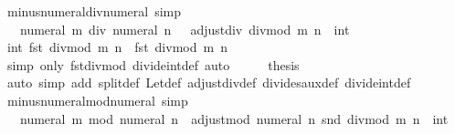 \begin{isabellebody}
\ minus{\isacharunderscore}{\kern0pt}numeral{\isacharunderscore}{\kern0pt}div{\isacharunderscore}{\kern0pt}numeral\ {\isacharbrackleft}{\kern0pt}simp{\isacharbrackright}{\kern0pt}{\isacharcolon}{\kern0pt}\isanewline
\ \ {\isachardoublequoteopen}{\isacharminus}{\kern0pt}\ numeral\ m\ div\ numeral\ n\ {\isacharequal}{\kern0pt}\ {\isacharminus}{\kern0pt}\ {\isacharparenleft}{\kern0pt}adjust{\isacharunderscore}{\kern0pt}div\ {\isacharparenleft}{\kern0pt}divmod\ m\ n{\isacharparenright}{\kern0pt}\ {\isacharcolon}{\kern0pt}{\isacharcolon}{\kern0pt}\ int{\isacharparenright}{\kern0pt}{\isachardoublequoteclose}\isanewline
%
\isadelimproof
%
\endisadelimproof
%
\isatagproof
{}\isamarkupfalse%
\ {\isacharminus}{\kern0pt}\isanewline
\ \ \isamarkupfalse%
\ {\isachardoublequoteopen}int\ {\isacharparenleft}{\kern0pt}fst\ {\isacharparenleft}{\kern0pt}divmod\ m\ n{\isacharparenright}{\kern0pt}{\isacharparenright}{\kern0pt}\ {\isacharequal}{\kern0pt}\ fst\ {\isacharparenleft}{\kern0pt}divmod\ m\ n{\isacharparenright}{\kern0pt}{\isachardoublequoteclose}\isanewline
\ \ \ \ \isamarkupfalse%
\ {\isacharparenleft}{\kern0pt}simp\ only{\isacharcolon}{\kern0pt}\ fst{\isacharunderscore}{\kern0pt}divmod\ divide{\isacharunderscore}{\kern0pt}int{\isacharunderscore}{\kern0pt}def{\isacharparenright}{\kern0pt}\ auto\isanewline
\ \ \isamarkupfalse%
\ \isamarkupfalse%
\ {\isacharquery}{\kern0pt}thesis\isanewline
\ \ \ \ \isamarkupfalse%
\ {\isacharparenleft}{\kern0pt}auto\ simp\ add{\isacharcolon}{\kern0pt}\ split{\isacharunderscore}{\kern0pt}def\ Let{\isacharunderscore}{\kern0pt}def\ adjust{\isacharunderscore}{\kern0pt}div{\isacharunderscore}{\kern0pt}def\ divides{\isacharunderscore}{\kern0pt}aux{\isacharunderscore}{\kern0pt}def\ divide{\isacharunderscore}{\kern0pt}int{\isacharunderscore}{\kern0pt}def{\isacharparenright}{\kern0pt}\isanewline
{}\isamarkupfalse%
%
\endisatagproof
{\isafoldproof}%
%
\isadelimproof
\isanewline
%
\endisadelimproof
\isanewline
{}\isamarkupfalse%
\ minus{\isacharunderscore}{\kern0pt}numeral{\isacharunderscore}{\kern0pt}mod{\isacharunderscore}{\kern0pt}numeral\ {\isacharbrackleft}{\kern0pt}simp{\isacharbrackright}{\kern0pt}{\isacharcolon}{\kern0pt}\isanewline
\ \ {\isachardoublequoteopen}{\isacharminus}{\kern0pt}\ numeral\ m\ mod\ numeral\ n\ {\isacharequal}{\kern0pt}\ adjust{\isacharunderscore}{\kern0pt}mod\ {\isacharparenleft}{\kern0pt}numeral\ n{\isacharparenright}{\kern0pt}\ {\isacharparenleft}{\kern0pt}snd\ {\isacharparenleft}{\kern0pt}divmod\ m\ n{\isacharparenright}{\kern0pt}\ {\isacharcolon}{\kern0pt}{\isacharcolon}{\kern0pt}\ int{\isacharparenright}{\kern0pt}{\isachardoublequoteclose}\isanewline

\end{isabellebody}

